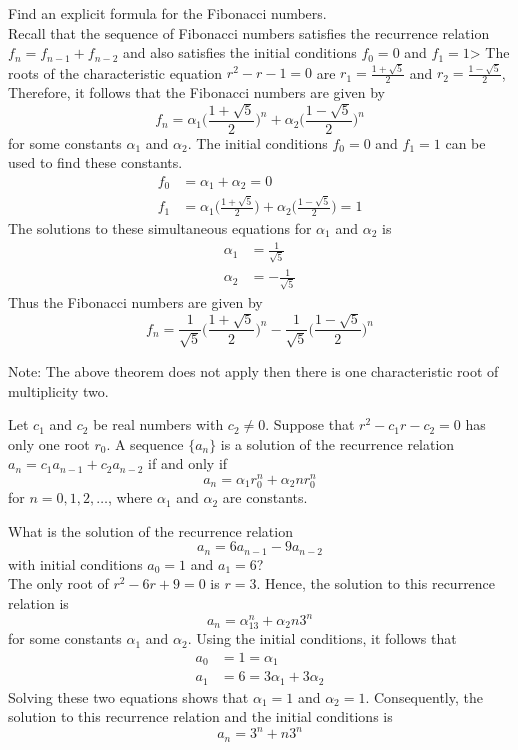 \documentclass[12pt]{article}
\begin{document}
\begin{example} Find an explicit formula for the Fibonacci numbers. \\ Recall that the sequence of Fibonacci numbers satisfies the recurrence relation $f_n = f_{n - 1} + f_{n - 2}$ and also satisfies the initial conditions $f_0 = 0$ and $f_1 = 1$> The roots of the characteristic equation $r^2 - r - 1 = 0$ are $r_1 = \frac{1 + \sqrt{5}}{2}$ and $r_2 = \frac{1 - \sqrt{5}}{2} $, Therefore, it follows that the Fibonacci numbers are given by $$f_n = \alpha_1\Big(\frac{1 + \sqrt{5}}{2}\Big)^n + \alpha_2\Big(\frac{1 - \sqrt{5}}{2}\Big)^n $$ for some constants $\alpha_1$ and $\alpha_2$. The initial conditions $f_0 = 0$ and $f_1 = 1$ can be used to find these constants. $$\begin{aligned} f_0 &= \alpha_ 1 + \alpha_2 = 0 \\ f_1 &= \alpha_1\Big(\frac{1 + \sqrt{5}}{2}\Big) + \alpha_2\Big(\frac{1 - \sqrt{5}}{2}\Big) = 1 \end{aligned} $$ The solutions to these simultaneous equations for $\alpha_1$ and $\alpha_2$ is $$\begin{aligned} \alpha_1 &= \frac{1}{\sqrt{5}} \\ \alpha_2 &= -\frac{1}{\sqrt{5}} \end{aligned} $$ Thus the Fibonacci numbers are given by $$f_n = \frac{1}{\sqrt{5}}\Big( \frac{1 + \sqrt{5}}{2}\Big)^n - \frac{1}{\sqrt{5}}\Big(\frac{ 1 - \sqrt{5}}{2}\Big)^n $$ \end{example}
Note: The above theorem does not apply then there is one characteristic root of multiplicity two. 
\begin{theorem} Let $c_1$ and $c_2$ be real numbers with $c_2 \neq 0$. Suppose that $r^2 - c_1r - c_2 = 0$ has only one root $r_0$. A sequence $\{a_n\}$ is a solution of the recurrence relation $a_n = c_1a_{n - 1} + c_2a_{n - 2}$ if and only if $$ a_n = \alpha_1r_0^n + \alpha_2nr_0^n $$ for $n = 0, 1, 2, \dots$, where $\alpha_1$ and $\alpha_2$ are constants. \end{theorem} 

\begin{example} What is the solution of the recurrence relation $$a_n = 6a_{n - 1} - 9a_{n - 2} $$ with initial conditions $a_0 = 1$ and $a_1 = 6$? \\ The only root of $r^2 - 6r + 9 = 0$ is $r = 3$. Hence, the solution to this recurrence relation is $$a_n = \alpha_13^n + \alpha_2n3^n $$ for some constants $\alpha_1$ and $\alpha_2$. Using the initial conditions, it follows that 
$$\begin{aligned} a_0 &= 1 = \alpha_1 \\ a_1 &= 6 = 3\alpha_1 + 3\alpha_2 \end{aligned} $$ Solving these two equations shows that $\alpha_ 1 = 1$ and $\alpha_2 = 1$. Consequently, the solution to this recurrence relation and the initial conditions is $$a_n = 3^n + n3^n $$ \end{example} 
\end{document}
